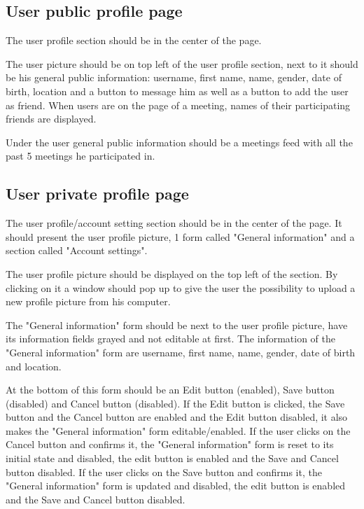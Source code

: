 \documentclass[conference]{IEEEtran}
\begin{document}
\subsection{User public profile page}

The user profile section should be in the center of the page.

The user picture should be on top left of the user profile section, next to it should be his general public information: username, first name, name, gender, date of birth, location and a button to message him as well as a button to add the user as friend. When users are on the page of a meeting, names of their participating friends are displayed.

Under the user general public information should be a meetings feed with all the past 5 meetings he participated in.

\subsection{User private profile page}

The user profile/account setting section should be in the center of the page.
It should present the user profile picture, 1 form called "General information" and a section called "Account settings".

The user profile picture should be displayed on the top left of the section. 
By clicking on it a window should pop up to give the user the possibility to upload a new profile picture from his computer.

The "General information" form should be next to the user profile picture, have its information fields grayed and not editable at first.
The information of the "General information" form are username, first name, name, gender, date of birth and location.

At the bottom of this form should be an Edit button (enabled), Save button (disabled) and Cancel button (disabled). 
If the Edit button is clicked, the Save button and the Cancel button are enabled and the Edit button disabled, it also makes the "General information" form editable/enabled.
If the user clicks on the Cancel button and confirms it, the "General information" form is reset to its initial state and disabled, the edit button is enabled and the Save and Cancel button disabled.
If the user clicks on the Save button and confirms it, the "General information" form is updated and disabled, the edit button is enabled and the Save and Cancel button disabled.
\end{document}
